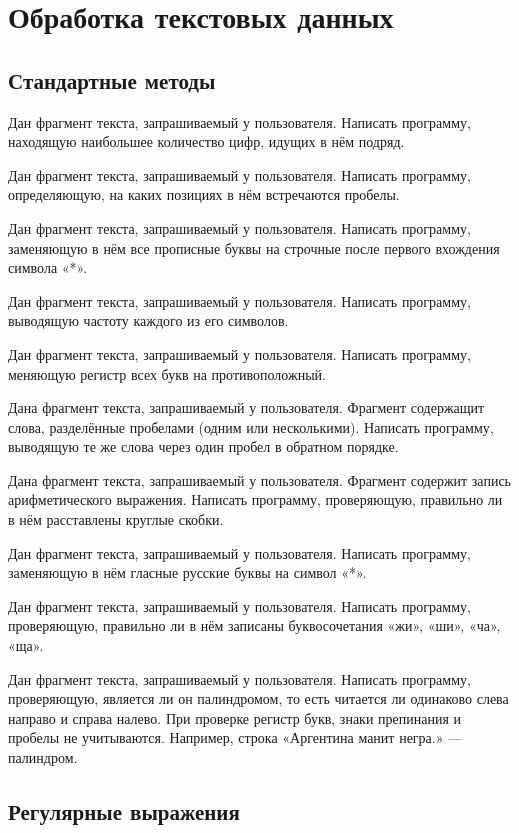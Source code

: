 \section{Обработка текстовых данных}

\subsection{Стандартные методы}

\task Дан фрагмент текста, запрашиваемый у пользователя. Написать
программу, находящую наибольшее количество цифр, идущих в нём подряд.

\task Дан фрагмент текста, запрашиваемый у пользователя. Написать
программу, определяющую, на каких позициях в нём встречаются пробелы.

\task Дан фрагмент текста, запрашиваемый у пользователя. Написать
программу, заменяющую в нём все прописные буквы на строчные после
первого вхождения символа «*».

\task Дан фрагмент текста, запрашиваемый у пользователя. Написать
программу, выводящую частоту каждого из его символов.

\task Дан фрагмент текста, запрашиваемый у пользователя. Написать
программу, меняющую регистр всех букв на противоположный.

\task Дана фрагмент текста, запрашиваемый у пользователя. Фрагмент
содержащит слова, разделённые пробелами (одним или
несколькими). Написать программу, выводящую те же слова через один
пробел в обратном порядке.

\task Дана фрагмент текста, запрашиваемый у пользователя. Фрагмент
содержит запись арифметического выражения. Написать программу,
проверяющую, правильно ли в нём расставлены круглые скобки.

\task Дан фрагмент текста, запрашиваемый у пользователя. Написать
программу, заменяющую в нём гласные русские буквы на символ «*».

\task Дан фрагмент текста, запрашиваемый у пользователя. Написать
программу, проверяющую, правильно ли в нём записаны буквосочетания
«жи», «ши», «ча», «ща».

\task Дан фрагмент текста, запрашиваемый у пользователя. Написать
программу, проверяющую, является ли он палиндромом, то есть читается
ли одинаково слева направо и справа налево. При проверке регистр букв,
знаки препинания и пробелы не учитываются. Например, строка «Аргентина
манит негра.» — палиндром.

\subsection{Регулярные выражения}


